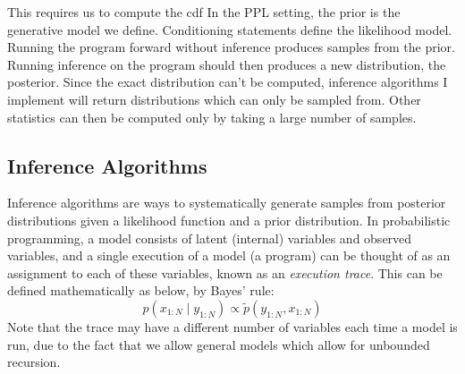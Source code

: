 
This requires us to compute the cdf
% 
In the PPL setting, the prior is the generative model we define. Conditioning statements define the likelihood model. Running the program forward without inference produces samples from the prior. Running inference on the program should then produces a new distribution, the posterior. Since the exact distribution can't be computed, inference algorithms I implement will return distributions which can only be sampled from. Other statistics can then be computed only by taking a large number of samples.
	
\subsection{Inference Algorithms}
			

Inference algorithms are ways to systematically generate samples from posterior distributions given a likelihood function and a prior distribution. In probabilistic programming, a model consists of latent (internal) variables and observed variables, and a single execution of a model (a program) can be thought of as an assignment to each of these variables, known as an \textit{execution trace}. This can be defined mathematically as below, by Bayes' rule:
% 
\[p(x_{1:N}\mid y_{1:N})\propto \tilde{p}(y_{1:N},x_{1:N})\]\label{eq:trace}
% 
Note that the trace may have a different number of variables each time a model is run, due to the fact that we allow general models which allow for unbounded recursion. 

